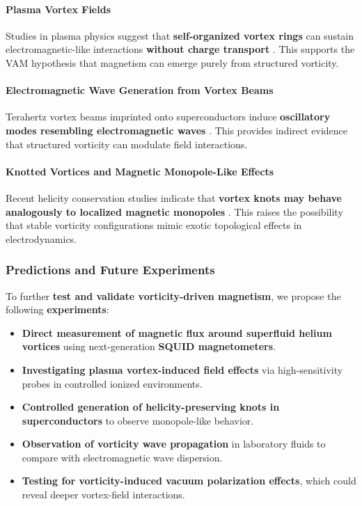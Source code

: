 \paragraph{Plasma Vortex Fields}
Studies in plasma physics suggest that \textbf{self-organized vortex rings} can sustain electromagnetic-like interactions \textbf{without charge transport} \cite{plasma_vortex_flows}. This supports the VAM hypothesis that magnetism can emerge purely from structured vorticity.

\paragraph{Electromagnetic Wave Generation from Vortex Beams}
Terahertz vortex beams imprinted onto superconductors induce \textbf{oscillatory modes resembling electromagnetic waves} \cite{higgs_waves_vortex}. This provides indirect evidence that structured vorticity can modulate field interactions.

\paragraph{Knotted Vortices and Magnetic Monopole-Like Effects}
Recent helicity conservation studies indicate that \textbf{vortex knots may behave analogously to localized magnetic monopoles} \cite{collected_helicity_papers}. This raises the possibility that stable vorticity configurations mimic exotic topological effects in electrodynamics.

\subsubsection*{Predictions and Future Experiments}
To further \textbf{test and validate vorticity-driven magnetism}, we propose the following \textbf{experiments}:

\begin{itemize}
    \item \textbf{Direct measurement of magnetic flux around superfluid helium vortices} using next-generation \textbf{SQUID magnetometers}.
    \item \textbf{Investigating plasma vortex-induced field effects} via high-sensitivity probes in controlled ionized environments.
    \item \textbf{Controlled generation of helicity-preserving knots in superconductors} to observe monopole-like behavior.
    \item \textbf{Observation of vorticity wave propagation} in laboratory fluids to compare with electromagnetic wave dispersion.
    \item \textbf{Testing for vorticity-induced vacuum polarization effects}, which could reveal deeper vortex-field interactions.
\end{itemize}

